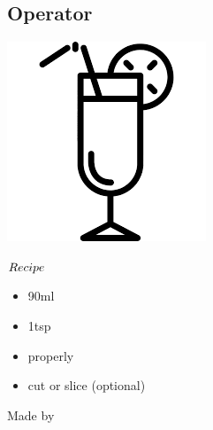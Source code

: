 \subsection{Operator}
\vspace{-7.6mm}
\hspace{30mm}
\includegraphics[scale=.07]{cocktail_glass_tall.png}
\vspace{2.5mm}
\begin{itembox}[l]{\boldmath $Recipe$}
\begin{itemize}
\setlength{\parskip}{0cm}
\setlength{\itemsep}{0cm}
\item \ww 90ml
\item \lj 1tsp
\item \ga properly
\item \lemon cut or slice (optional)
\end{itemize}
\vspace{-4mm}
Made by \build
\end{itembox}
